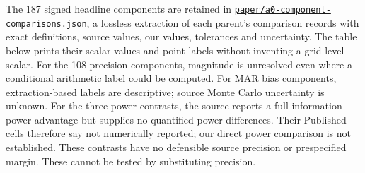 \documentclass[11pt]{article}
\newcommand{\file}[1]{\href{https://github.com/alectionary/vibe-math/blob/master/formalization/schwabe-psychometric-genetics/#1}{\nolinkurl{#1}}}
\begin{document}
The 187 signed headline components are retained in \file{paper/a0-component-comparisons.json}, a lossless extraction of each parent's comparison records with exact definitions, source values, our values, tolerances and uncertainty. The table below prints their scalar values and point labels without inventing a grid-level scalar. For the 108 precision components, magnitude is unresolved even where a conditional arithmetic label could be computed. For MAR bias components, extraction-based labels are descriptive; source Monte Carlo uncertainty is unknown. For the three power contrasts, the source reports a full-information power advantage but supplies no quantified power differences. Their Published cells therefore say not numerically reported; our direct power comparison is not established. These contrasts have no defensible source precision or prespecified margin. These cannot be tested by substituting precision.
\end{document}
